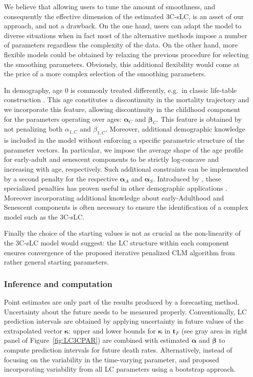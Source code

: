 \documentclass[Thesis]{subfiles}
\begin{document}
We believe that allowing users to tune the amount of smoothness, and consequently the effective dimension of the estimated 3C-sLC, is an asset of our approach, and not a drawback. On the one hand, users can adapt the model to diverse situations when in fact most of the alternative methods impose a number of parameters regardless the complexity of the data. On the other hand, more flexible models could be obtained by relaxing the previous procedure for selecting the smoothing parameters. Obviously, this additional flexibility would come at the price of a more complex selection of the smoothing parameters.

In demography, age 0 is commonly treated differently, e.g.~in classic life-table construction \citep{chiang1984life}. This age constitutes a discontinuity in the mortality trajectory and we incorporate this feature, allowing discontinuity in the childhood component for the parameters operating over ages: $\bm{\alpha}_{C}$ and $\bm{\beta}_{C}$. This feature is obtained by not penalizing both $\alpha_{1,C}$ and $\beta_{1,C}$. Moreover, additional demographic knowledge is included in the model without enforcing a specific parametric structure of the parameter vectors. In particular, we impose the average shape of the age profile for early-adult and senescent components to be strictly log-concave and increasing with age, respectively. Such additional constraints can be implemented by a second penalty for the respective $\bm{\alpha}_{A}$ and $\bm{\alpha}_{S}$. Introduced by \citet{bollaerts2006simple}, these specialized penalties has proven useful in other demographic applications \citep{camarda2016sums, remund2018young, camarda2019smooth}. Moreover incorporating additional knowledge about early-Adulthood and Senescent components is often necessary to ensure the identification of a complex model such as the 3C-sLC.  

Finally the choice of the starting values is not as crucial as the non-linearity of the 3C-sLC model would suggest: the LC structure within each component ensures convergence of the proposed iterative penalized CLM algorithm from rather general starting parameters. 

\subsubsection{Inference and computation}
Point estimates are only part of the results produced by a forecasting method. Uncertainty about the future needs to be measured properly. Conventionally, LC prediction intervals are obtained by applying uncertainty in future values of the extrapolated vector $\bm{\kappa}$: upper and lower bounds for $\bm{\kappa}$ in $\bm{t}_{F}$ (see gray area in right panel of Figure~\ref{fig:LC3CPAR}) are combined with estimated $\bm{\alpha}$ and $\bm{\beta}$ to compute prediction intervals for future death rates. Alternatively, instead of focusing on the variability in the time-varying parameter, \citet{brouhns2005bootstrapping} and \citet{koissi2006evaluating} proposed incorporating variability from all LC parameters using a bootstrap approach. 
\end{document}
